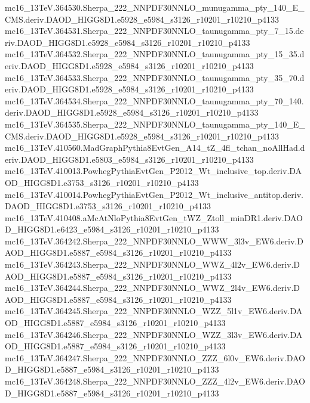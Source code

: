mc16_13TeV.364530.Sherpa_222_NNPDF30NNLO_munugamma_pty_140_E_CMS.deriv.DAOD_HIGG8D1.e5928_e5984_s3126_r10201_r10210_p4133 \\
mc16_13TeV.364531.Sherpa_222_NNPDF30NNLO_taunugamma_pty_7_15.deriv.DAOD_HIGG8D1.e5928_e5984_s3126_r10201_r10210_p4133 \\
mc16_13TeV.364532.Sherpa_222_NNPDF30NNLO_taunugamma_pty_15_35.deriv.DAOD_HIGG8D1.e5928_e5984_s3126_r10201_r10210_p4133 \\
mc16_13TeV.364533.Sherpa_222_NNPDF30NNLO_taunugamma_pty_35_70.deriv.DAOD_HIGG8D1.e5928_e5984_s3126_r10201_r10210_p4133 \\
mc16_13TeV.364534.Sherpa_222_NNPDF30NNLO_taunugamma_pty_70_140.deriv.DAOD_HIGG8D1.e5928_e5984_s3126_r10201_r10210_p4133 \\
mc16_13TeV.364535.Sherpa_222_NNPDF30NNLO_taunugamma_pty_140_E_CMS.deriv.DAOD_HIGG8D1.e5928_e5984_s3126_r10201_r10210_p4133 \\
mc16_13TeV.410560.MadGraphPythia8EvtGen_A14_tZ_4fl_tchan_noAllHad.deriv.DAOD_HIGG8D1.e5803_e5984_s3126_r10201_r10210_p4133 \\
mc16_13TeV.410013.PowhegPythiaEvtGen_P2012_Wt_inclusive_top.deriv.DAOD_HIGG8D1.e3753_s3126_r10201_r10210_p4133 \\
mc16_13TeV.410014.PowhegPythiaEvtGen_P2012_Wt_inclusive_antitop.deriv.DAOD_HIGG8D1.e3753_s3126_r10201_r10210_p4133 \\
mc16_13TeV.410408.aMcAtNloPythia8EvtGen_tWZ_Ztoll_minDR1.deriv.DAOD_HIGG8D1.e6423_e5984_s3126_r10201_r10210_p4133 \\
mc16_13TeV.364242.Sherpa_222_NNPDF30NNLO_WWW_3l3v_EW6.deriv.DAOD_HIGG8D1.e5887_e5984_s3126_r10201_r10210_p4133 \\
mc16_13TeV.364243.Sherpa_222_NNPDF30NNLO_WWZ_4l2v_EW6.deriv.DAOD_HIGG8D1.e5887_e5984_s3126_r10201_r10210_p4133 \\
mc16_13TeV.364244.Sherpa_222_NNPDF30NNLO_WWZ_2l4v_EW6.deriv.DAOD_HIGG8D1.e5887_e5984_s3126_r10201_r10210_p4133 \\
mc16_13TeV.364245.Sherpa_222_NNPDF30NNLO_WZZ_5l1v_EW6.deriv.DAOD_HIGG8D1.e5887_e5984_s3126_r10201_r10210_p4133 \\
mc16_13TeV.364246.Sherpa_222_NNPDF30NNLO_WZZ_3l3v_EW6.deriv.DAOD_HIGG8D1.e5887_e5984_s3126_r10201_r10210_p4133 \\
mc16_13TeV.364247.Sherpa_222_NNPDF30NNLO_ZZZ_6l0v_EW6.deriv.DAOD_HIGG8D1.e5887_e5984_s3126_r10201_r10210_p4133 \\
mc16_13TeV.364248.Sherpa_222_NNPDF30NNLO_ZZZ_4l2v_EW6.deriv.DAOD_HIGG8D1.e5887_e5984_s3126_r10201_r10210_p4133 \\
